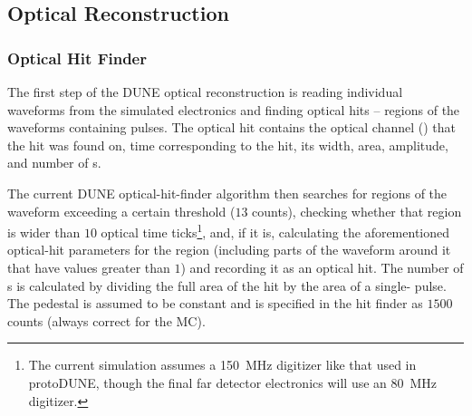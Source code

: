 


\subsection{Optical Reconstruction}

\subsubsection{Optical Hit Finder}
\label{sec:OpticalHitFinder}
The first step of the DUNE optical reconstruction is reading
individual waveforms from the simulated  electronics
and finding optical hits -- regions of the waveforms containing pulses.
The optical hit contains the optical channel () that the hit
was found on, time corresponding to the hit, its width,
area, amplitude, and number of \phel{}s.


The current DUNE optical-hit-finder algorithm then searches for regions of the waveform
exceeding a certain threshold ($13$  counts), checking whether that region
is wider than $10$ optical time ticks\footnote{The current simulation assumes a 
\SI{150}{MHz} digitizer like that used in protoDUNE, though the final far detector electronics
will use an \SI{80}{MHz} digitizer.}, and, if it is, calculating the aforementioned
optical-hit parameters for the region (including parts of the waveform around it
that have  values greater than $1$) and recording it as an optical hit.
The number of \phel{}s is calculated by dividing the full area of the hit
by the area of a single-\phel{} pulse.
The pedestal is assumed to be constant and is specified in the hit finder as $1500$  counts (always correct for the MC).


